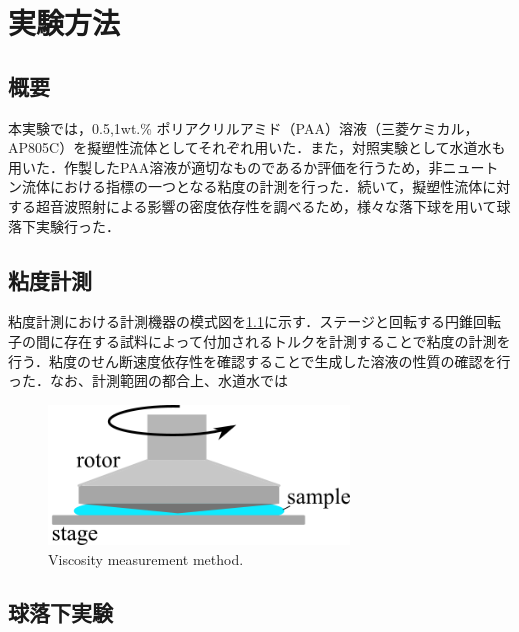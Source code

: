 \chapter{実験方法}
\section{概要}
本実験では，0.5,1wt.\% ポリアクリルアミド（PAA）溶液（三菱ケミカル，AP805C）を擬塑性流体としてそれぞれ用いた．また，対照実験として水道水も用いた．作製したPAA溶液が適切なものであるか評価を行うため，非ニュートン流体における指標の一つとなる粘度の計測を行った．続いて，擬塑性流体に対する超音波照射による影響の密度依存性を調べるため，様々な落下球を用いて球落下実験行った．

\section{粘度計測}
粘度計測における計測機器の模式図を\ref{fig:viscosity}に示す．ステージと回転する円錐回転子の間に存在する試料によって付加されるトルクを計測することで粘度の計測を行う．粘度のせん断速度依存性を確認することで生成した溶液の性質の確認を行った．なお、計測範囲の都合上、水道水では

\begin{center}
    \begin{figure}[h]
        \includegraphics[clip,width=8.0cm]{2-Methods/Viscosity-Measurement.png}
        \caption{Viscosity measurement method.}
        \label{fig:viscosity}
    \end{figure}
\end{center}

\section{球落下実験}

